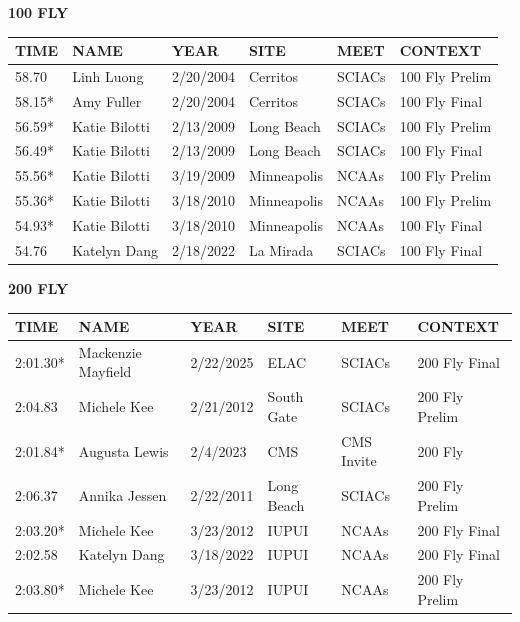 \begin{table}[H]
\centering
\begin{minipage}[t]{0.48\textwidth}
\centering
\textbf{100 FLY}\\[0.1cm]
\begin{tabular}{@{}p{1.8cm}p{2.8cm}p{1.2cm}p{1.4cm}p{1.4cm}p{2.0cm}@{}}
\hline
    \textbf{TIME} & \textbf{NAME} & \textbf{YEAR} & \textbf{SITE} & \textbf{MEET} & \textbf{CONTEXT} \\
\hline
    58.70 & Linh Luong & 2/20/2004 & Cerritos & SCIACs & 100 Fly Prelim \\
    58.15* & Amy Fuller & 2/20/2004 & Cerritos & SCIACs & 100 Fly Final \\
    56.59* & Katie Bilotti & 2/13/2009 & Long Beach & SCIACs & 100 Fly Prelim \\
    56.49* & Katie Bilotti & 2/13/2009 & Long Beach & SCIACs & 100 Fly Final \\
    55.56* & Katie Bilotti & 3/19/2009 & Minneapolis & NCAAs & 100 Fly Prelim \\
    55.36* & Katie Bilotti & 3/18/2010 & Minneapolis & NCAAs & 100 Fly Prelim \\
    54.93* & Katie Bilotti & 3/18/2010 & Minneapolis & NCAAs & 100 Fly Final \\
    54.76 & Katelyn Dang & 2/18/2022 & La Mirada & SCIACs & 100 Fly Final \\
\hline
\end{tabular}
\end{minipage}\hfill
\begin{minipage}[t]{0.48\textwidth}
\centering
\textbf{200 FLY}\\[0.1cm]
\begin{tabular}{@{}p{1.8cm}p{2.8cm}p{1.2cm}p{1.4cm}p{1.4cm}p{2.0cm}@{}}
\hline
    \textbf{TIME} & \textbf{NAME} & \textbf{YEAR} & \textbf{SITE} & \textbf{MEET} & \textbf{CONTEXT} \\
\hline
    2:01.30* & Mackenzie Mayfield & 2/22/2025 & ELAC & SCIACs & 200 Fly Final \\
    2:04.83 & Michele Kee & 2/21/2012 & South Gate & SCIACs & 200 Fly Prelim \\
    2:01.84* & Augusta Lewis & 2/4/2023 & CMS & CMS Invite & 200 Fly \\
    2:06.37 & Annika Jessen & 2/22/2011 & Long Beach & SCIACs & 200 Fly Prelim \\
    2:03.20* & Michele Kee & 3/23/2012 & IUPUI & NCAAs & 200 Fly Final \\
    2:02.58 & Katelyn Dang & 3/18/2022 & IUPUI & NCAAs & 200 Fly Final \\
    2:03.80* & Michele Kee & 3/23/2012 & IUPUI & NCAAs & 200 Fly Prelim \\
\hline
\end{tabular}
\end{minipage}
\end{table}

